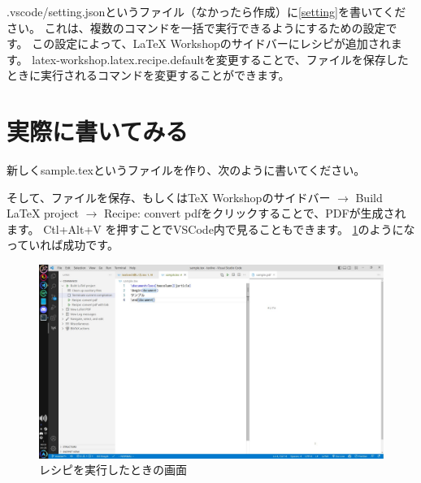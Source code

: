 \documentclass[twocolumn]{jarticle}
\begin{document}
.vscode/setting.jsonというファイル（なかったら作成）に\ref{setting}を書いてください。
これは、複数のコマンドを一括で実行できるようにするための設定です。
この設定によって、LaTeX Workshopのサイドバーにレシピが追加されます。
latex-workshop.latex.recipe.defaultを変更することで、ファイルを保存したときに実行されるコマンドを変更することができます。

\section{実際に書いてみる}
新しくsample.texというファイルを作り、次のように書いてください。


そして、ファイルを保存、もしくはTeX Workshopのサイドバー $\to$ Build LaTeX project $\to$ Recipe: convert pdfをクリックすることで、PDFが生成されます。
Ctl+Alt+V を押すことでVSCode内で見ることもできます。
\ref{run-recipe}のようになっていれば成功です。
\begin{figure}[b]
    \centering
    \includegraphics[keepaspectratio, scale=0.1]{run-recipe.jpg}
    \caption{レシピを実行したときの画面}
    \label{run-recipe}
\end{figure}
\end{document}
